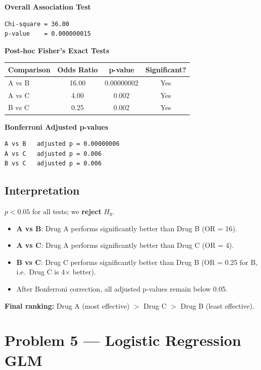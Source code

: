 \documentclass[12pt,a4paper]{article}
\begin{document}
\begin{outputbox}
\textbf{Overall Association Test}
\begin{verbatim}
Chi-square = 36.00
p-value    = 0.000000015
\end{verbatim}

\textbf{Post-hoc Fisher's Exact Tests}
\begin{center}
\begin{tabular}{lccc}
\toprule
Comparison & Odds Ratio & p-value      & Significant? \\
\midrule
A vs B     & 16.00      & 0.00000002   & Yes \\
A vs C     & 4.00       & 0.002        & Yes \\
B vs C     & 0.25       & 0.002        & Yes \\
\bottomrule
\end{tabular}
\end{center}

\textbf{Bonferroni Adjusted p-values}
\begin{verbatim}
A vs B   adjusted p = 0.00000006
A vs C   adjusted p = 0.006
B vs C   adjusted p = 0.006
\end{verbatim}
\end{outputbox}

\subsection{Interpretation}

\begin{interpbox}
$p < 0.05$ for all tests; we \textbf{reject} $H_0$.
\begin{itemize}[noitemsep]
  \item \textbf{A vs B}: Drug A performs significantly better than Drug B (OR = 16).
  \item \textbf{A vs C}: Drug A performs significantly better than Drug C (OR = 4).
  \item \textbf{B vs C}: Drug C performs significantly better than Drug B (OR = 0.25 for B, i.e.\ Drug C is 4× better).
  \item After Bonferroni correction, all adjusted p-values remain below 0.05.
\end{itemize}
\textbf{Final ranking:} Drug A (most effective) $>$ Drug C $>$ Drug B (least effective).
\end{interpbox}

\newpage
\section{Problem 5 — Logistic Regression GLM}
\end{document}
